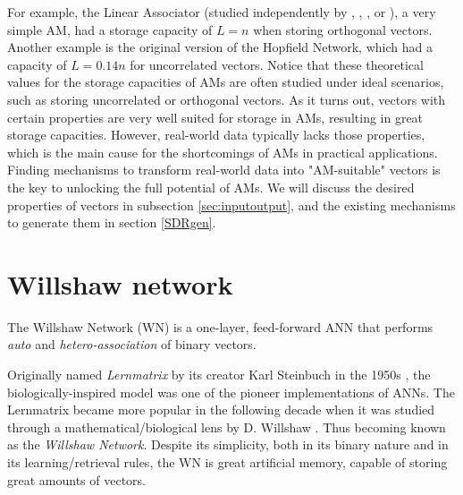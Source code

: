 \documentclass[runningheads]{llncs}
\begin{document}
For example, the Linear Associator (studied independently by \cite{anderson1968memory}, \cite{kohonen1972correlation}, \cite{anderson1972simple}, or \cite{nakano1972associatron}), a very simple AM, had a storage capacity of $L=n$ when storing orthogonal vectors. Another example is the original version of the Hopfield Network, which had a capacity of $L = 0.14n$ for uncorrelated vectors. 
Notice that these theoretical values for the storage capacities of AMs are often studied under ideal scenarios, such as storing uncorrelated or orthogonal vectors. As it turns out, vectors with certain properties are very well suited for storage in AMs, resulting in great storage capacities. However, real-world data typically lacks those properties, which is the main cause for the shortcomings of AMs in practical applications. Finding mechanisms to transform real-world data into "AM-suitable" vectors is the key to unlocking the full potential of AMs. We will discuss the desired properties of vectors in subsection \ref{sec:inputoutput}, and the existing mechanisms to generate them in section \ref{SDRgen}.


\section{Willshaw network}
\label{sec:wn}
The Willshaw Network (WN) \cite{willshaw1969non} is a one-layer, feed-forward ANN that performs \textit{auto} and \textit{hetero-association} of binary vectors.

Originally named \textit{Lernmatrix} by its creator Karl Steinbuch in the 1950s \cite{steinbuch1961lernmatrix}, the biologically-inspired model was one of the pioneer implementations of ANNs.
The Lernmatrix became more popular in the following decade when it was studied through a mathematical/biological lens by D. Willshaw \cite{willshaw1969non}. Thus becoming known as the \textit{Willshaw Network}. Despite its simplicity, both in its binary nature and in its learning/retrieval rules, the WN is great artificial memory, capable of storing great amounts of vectors.
\end{document}
